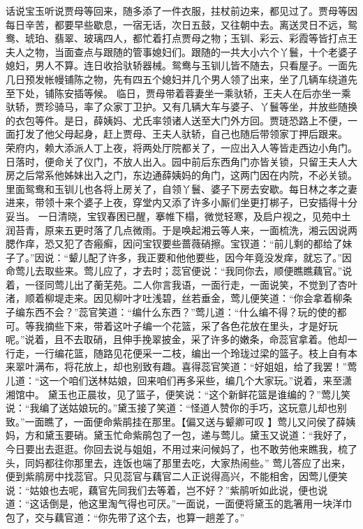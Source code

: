 \documentclass[12pt,oneside]{book}
\begin{document}
话说宝玉听说贾母等回来，随多添了一件衣服，拄杖前边来，都见过了。贾母等因每日辛苦，都要早些歇息，一宿无话，次日五鼓，又往朝中去。离送灵日不远，鸳鸯、琥珀、翡翠、玻璃四人，都忙着打点贾母之物；玉钏、彩云、彩霞等皆打点王夫人之物，当面查点与跟随的管事媳妇们。跟随的一共大小六个丫鬟，十个老婆子媳妇，男人不算。连日收拾驮轿器械。鸳鸯与玉钏儿皆不随去，只看屋子。一面先几日预发帐幔铺陈之物，先有四五个媳妇并几个男人领了出来，坐了几辆车绕道先至下处，铺陈安插等候。
临日，贾母带着蓉妻坐一乘驮轿，王夫人在后亦坐一乘驮轿，贾珍骑马，率了众家丁卫护。又有几辆大车与婆子、丫鬟等坐，并放些随换的衣包等件。是日，薛姨妈、尤氏率领诸人送至大门外方回。贾琏恐路上不便，一面打发了他父母起身，赶上贾母、王夫人驮轿，自己也随后带领家丁押后跟来。
荣府内，赖大添派人丁上夜，将两处厅院都关了，一应出入人等皆走西边小角门。日落时，便命关了仪门，不放人出入。园中前后东西角门亦皆关锁，只留王夫人大房之后常系他姊妹出入之门，东边通薛姨妈的角门，这两门因在内院，不必关锁。里面鸳鸯和玉钏儿也各将上房关了，自领丫鬟、婆子下房去安歇。每日林之孝之妻进来，带领十来个婆子上夜，穿堂内又添了许多小厮们坐更打梆子，已安插得十分妥当。
一日清晓，宝钗春困已醒，搴帷下榻，微觉轻寒，及启户视之，见苑中土润苔青，原来五更时落了几点微雨。于是唤起湘云等人来，一面梳洗，湘云因说两腮作痒，恐又犯了杏瘢癣，因问宝钗要些蔷薇硝擦。宝钗道：“前儿剩的都给了妹子了。”因说：“颦儿配了许多，我正要和他他要些，因今年竟没发痒，就忘了。”因命莺儿去取些来。莺儿应了，才去时；蕊官便说：“我同你去，顺便瞧瞧藕官。”说着，一径同莺儿出了蘅芜苑。二人你言我语，一面行走，一面说笑，不觉到了杏叶渚，顺着柳堤走来。因见柳叶才吐浅碧，丝若垂金，莺儿便笑道：“你会拿着柳条子编东西不会？”蕊官笑道：“编什么东西？”莺儿道：“什么编不得？玩的使的都可。等我摘些下来，带着这叶子编一个花篮，采了各色花放在里头，才是好玩呢。”说着，且不去取硝，且伸手挽翠披金，采了许多的嫩条，命蕊官拿着。他却一行走，一行编花篮，随路见花便采一二枝，编出一个玲珑过梁的篮子。枝上自有本来翠叶满布，将花放上，却也别致有趣。喜得蕊官笑道：“好姐姐，给了我罢！”莺儿道：“这一个咱们送林姑娘，回来咱们再多采些，编几个大家玩。”说着，来至潇湘馆中。
黛玉也正晨妆，见了篮子，便笑说：“这个新鲜花篮是谁编的？”莺儿笑说：“我编了送姑娘玩的。”黛玉接了笑道：“怪道人赞你的手巧，这玩意儿却也别致。”一面瞧了，一面便命紫鹃挂在那里。【偏又送与颦卿可叹 】莺儿又问侯了薛姨妈，方和黛玉要硝。黛玉忙命紫鹃包了一包，递与莺儿。黛玉又说道：“我好了，今日要出去逛逛。你回去说与姐姐，不用过来问候妈了，也不敢劳他来瞧我，梳了头，同妈都往你那里去，连饭也端了那里去吃，大家热闹些。”
莺儿答应了出来，便到紫鹃房中找蕊官。只见蕊官与藕官二人正说得高兴，不能相舍，因莺儿便笑说：“姑娘也去呢，藕官先同我们去等着，岂不好？”紫鹃听如此说，便也说道：“这话倒是，他这里淘气得也可厌。”一面说，一面便将黛玉的匙箸用一块洋巾包了，交与藕官道：“你先带了这个去，也算一趟差了。”
\end{document}
